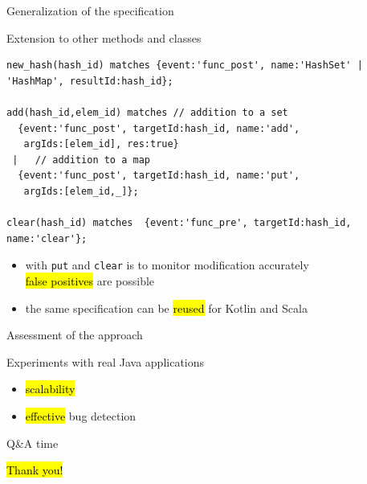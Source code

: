 \documentclass[10pt,usenames,dvipsnames]{beamer}
\begin{document}

\begin{frame}[fragile]{Generalization of the specification}
  \begin{block}{Extension to other methods and classes}
    \begin{lstlisting}[basicstyle=\ttfamily\footnotesize]
new_hash(hash_id) matches {event:'func_post', name:'HashSet' | 'HashMap', resultId:hash_id};

add(hash_id,elem_id) matches // addition to a set
  {event:'func_post', targetId:hash_id, name:'add',  
   argIds:[elem_id], res:true}
 |   // addition to a map  
  {event:'func_post', targetId:hash_id, name:'put',  
   argIds:[elem_id,_]};

clear(hash_id) matches  {event:'func_pre', targetId:hash_id, name:'clear'}; 
    \end{lstlisting}

  \end{block}
  \begin{itemize}
  \item with \lstinline{put} and \lstinline{clear} is  to monitor modification accurately \\
   \hl{false positives} are possible 
  \item the same specification can be \hl{reused} for Kotlin and Scala
  \end{itemize}
  \end{frame}


\begin{frame}[fragile]{Assessment of the approach}
  \begin{block}{Experiments with real Java applications}
    \begin{itemize}
    \item \hl{scalability}
    \item \hl{effective} bug detection
    \end{itemize}
  \end{block}
  \end{frame}


\begin{frame}{Q\&A time}
\vspace*{16ex}
  \begin{center}
  \LARGE \hl{Thank you!}
\end{center}
\end{frame}
\end{document}
